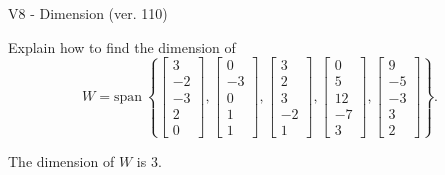 \begin{exercise}
  \begin{exerciseTitle}V8 - Dimension (ver. 110)\end{exerciseTitle}
  \begin{exerciseStatement}
    Explain how to find the dimension of 
\[W=\mathrm{span}\ \left\{\left[\begin{array}{r}
3 \\
-2 \\
-3 \\
2 \\
0
\end{array}\right] , \left[\begin{array}{r}
0 \\
-3 \\
0 \\
1 \\
1
\end{array}\right] , \left[\begin{array}{r}
3 \\
2 \\
3 \\
-2 \\
1
\end{array}\right] , \left[\begin{array}{r}
0 \\
5 \\
12 \\
-7 \\
3
\end{array}\right] , \left[\begin{array}{r}
9 \\
-5 \\
-3 \\
3 \\
2
\end{array}\right]\right\}.\]



  \end{exerciseStatement}
  \begin{exerciseAnswer}
   The dimension of \(W\) is  \(3\).
  


  \end{exerciseAnswer}
\end{exercise}